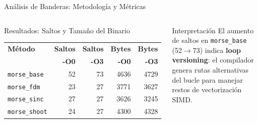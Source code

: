 \documentclass[aspectratio=169,10pt]{beamer}
\begin{document}
\begin{frame}[allowframebreaks]{Análisis de Banderas: Metodología y Métricas}
\begin{columns}[T]
\begin{block}{Resultados: Saltos y Tamaño del Binario}
\begin{center}
\small
\begin{tabular}{lrrrr}
\toprule
\textbf{Método} & \textbf{Saltos} & \textbf{Saltos} & \textbf{Bytes} & \textbf{Bytes}\\
 & \textbf{-O0} & \textbf{-O3} & \textbf{-O0} & \textbf{-O3}\\
\midrule
\texttt{morse\_base}  & 52 & 73 & 4636 & 4729\\
\texttt{morse\_fdm}   & 23 & 27 & 3771 & 3627\\
\texttt{morse\_sinc}  & 27 & 27 & 3626 & 3245\\
\texttt{morse\_shoot} & 24 & 27 & 4300 & 4328\\
\bottomrule
\end{tabular}
\end{center}
\end{block}
\vspace{-0.135cm}
\begin{alertbox}{Interpretación}
El aumento de saltos en \texttt{morse\_base} (52$\to$73) indica \textbf{loop versioning}: el compilador genera rutas alternativas del bucle para manejar restos de vectorización SIMD.
\end{alertbox}
\end{columns}
\end{frame}
\end{document}
